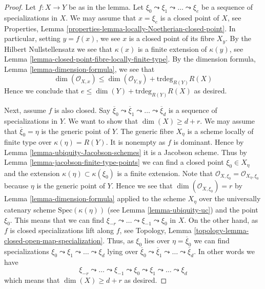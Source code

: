 \begin{proof}
Let $f : X \to Y$ be as in the lemma.
Let $\xi_0 \leadsto \xi_1 \leadsto \ldots \leadsto \xi_e$ be
a sequence of specializations in $X$. We may assume that $x = \xi_e$
is a closed point of $X$, see
Properties, Lemma \ref{properties-lemma-locally-Noetherian-closed-point}.
In particular, setting $y = f(x)$, we see $x$ is a closed point of its fibre
$X_y$. By the Hilbert Nullstellensatz we see that $\kappa(x)$ is a finite
extension of $\kappa(y)$, see
Lemma \ref{lemma-closed-point-fibre-locally-finite-type}.
By the dimension formula, Lemma \ref{lemma-dimension-formula},
we see that
$$
\dim(\mathcal{O}_{X, x}) \leq \dim(\mathcal{O}_{Y, y}) +
\text{trdeg}_{R(Y)} R(X)
$$
Hence we conclude that $e \leq \dim(Y) + \text{trdeg}_{R(Y)} R(X)$ as desired.

\medskip\noindent
Next, assume $f$ is also closed.
Say $\overline{\xi}_0 \leadsto \overline{\xi}_1 \leadsto \ldots
\leadsto \overline{\xi}_d$ is a sequence of specializations in $Y$.
We want to show that $\dim(X) \geq d + r$.
We may assume that $\overline{\xi}_0 = \eta$ is the generic point of $Y$.
The generic fibre $X_\eta$ is a scheme locally of finite type over
$\kappa(\eta) = R(Y)$. It is nonempty as $f$ is dominant. Hence by
Lemma \ref{lemma-ubiquity-Jacobson-schemes} it is a Jacobson scheme.
Thus by Lemma \ref{lemma-jacobson-finite-type-points}
we can find a closed point $\xi_0 \in X_\eta$ and the extension
$\kappa(\eta) \subset \kappa(\xi_0)$ is
a finite extension. Note that
$\mathcal{O}_{X, \xi_0} = \mathcal{O}_{X_\eta, \xi_0}$ because
$\eta$ is the generic point of $Y$. Hence we see that
$\dim(\mathcal{O}_{X, \xi_0}) = r$ by Lemma \ref{lemma-dimension-formula}
applied to the scheme $X_\eta$ over the universally catenary
scheme $\text{Spec}(\kappa(\eta))$ (see Lemma \ref{lemma-ubiquity-uc})
and the point $\xi_0$. This means that we can find
$\xi_{-r} \leadsto \ldots \leadsto \xi_{-1} \leadsto \xi_0$
in $X$. On the other hand, as $f$ is closed specializations
lift along $f$, see
Topology, Lemma \ref{topology-lemma-closed-open-map-specialization}.
Thus, as $\xi_0$ lies
over $\eta = \overline{\xi}_0$ we can
find specializations $\xi_0 \leadsto \xi_1 \leadsto \ldots \leadsto \xi_d$
lying over $\overline{\xi}_0 \leadsto \overline{\xi}_1 \leadsto \ldots
\leadsto \overline{\xi}_d$. In other words we have
$$
\xi_{-r} \leadsto \ldots \leadsto \xi_{-1} \leadsto \xi_0
\leadsto \xi_1 \leadsto \ldots \leadsto \xi_d
$$
which means that $\dim(X) \geq d + r$ as desired.
\end{proof}












